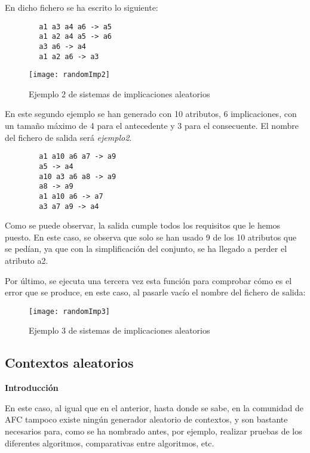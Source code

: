     En dicho fichero se ha escrito lo siguiente:

    \begin{verbatim}
        a1 a3 a4 a6 -> a5 
        a1 a2 a4 a5 -> a6 
        a3 a6 -> a4 
        a1 a2 a6 -> a3    
    \end{verbatim}


    \begin{figure}[H]
        \centering
        \texttt{[image: randomImp2]}
        \caption{Ejemplo 2 de sistemas de implicaciones aleatorios}
        \label{fig:randomImp2}
    \end{figure}

    En este segundo ejemplo se han generado con 10 atributos, 6 implicaciones, con un tama\~no m\'aximo de 4 para el antecedente y 3 para el 
    consecuente. El nombre del fichero de salida ser\'a \textit{ejemplo2}.

    \begin{verbatim}
        a1 a10 a6 a7 -> a9 
        a5 -> a4 
        a10 a3 a6 a8 -> a9 
        a8 -> a9 
        a1 a10 a6 -> a7 
        a3 a7 a9 -> a4 
    \end{verbatim}
    Como se puede observar, la salida cumple todos los requisitos que le hemos puesto. En este caso, se observa que solo se han usado 9 de 
    los 10 atributos que se ped\'ian, ya que con la simplificaci\'on del conjunto, se ha llegado a perder el atributo a2.
    \\
    
    \bigskip

    Por \'ultimo, se ejecuta una tercera vez esta funci\'on para comprobar c\'omo es el error que se produce, en este caso, al pasarle vac\'io 
    el nombre del fichero de salida:

    \begin{figure}[H]
        \centering
        \texttt{[image: randomImp3]}
        \caption{Ejemplo 3 de sistemas de implicaciones aleatorios}
        \label{fig:randomImp3}
    \end{figure}

    \clearpage


\subsection{Contextos aleatorios}

    \textbf{Introducci\'on}

    En este caso, al igual que en el anterior, hasta donde se sabe, en la comunidad de AFC tampoco existe ning\'un generador aleatorio de 
    contextos, y son bastante necesarios para, como se ha nombrado antes, por ejemplo, realizar pruebas de los diferentes algoritmos, comparativas 
    entre algoritmos, etc.

